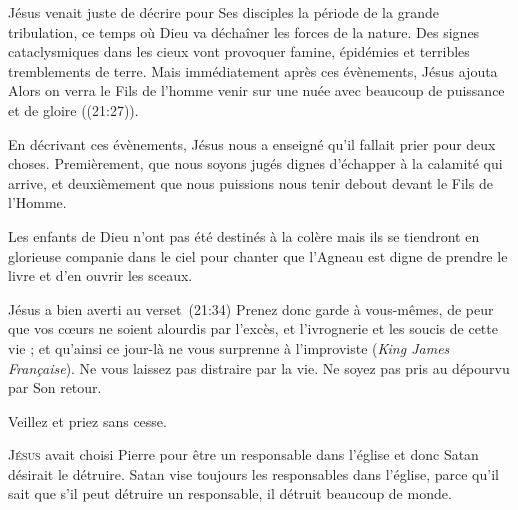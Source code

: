 Jésus venait juste de décrire pour Ses disciples la période
 de la grande tribulation, ce temps où Dieu va déchaîner les forces
 de la nature. Des signes cataclysmiques dans les cieux vont provoquer famine,
 épidémies et terribles tremblements de terre.
 Mais immédiatement après ces évènements, Jésus ajouta\frcolon{} 
 \Og Alors on verra le Fils de l'homme venir sur une nuée avec beaucoup
 de puissance et de gloire \Fg{} ((21:27)).


En décrivant ces évènements, Jésus nous a enseigné qu'il fallait prier pour deux choses.
 Premièrement, que nous soyons jugés dignes d'échapper à la calamité
 qui arrive, et deuxièmement que nous puissions nous tenir debout
 devant le Fils de l'Homme.

Les enfants de Dieu n'ont pas été destinés à la colère mais ils se tiendront
 en glorieuse companie dans le ciel pour chanter que l'Agneau
 est digne de prendre le livre et d'en ouvrir les sceaux.

Jésus a bien averti au verset~(21:34)\frcolon{} 
 \Og Prenez donc garde à vous-mêmes, de peur que vos c\oe{}urs ne soient
 alourdis par l’excès, et l’ivrognerie et les soucis de cette vie ;
 et qu'ainsi ce jour-là ne vous surprenne à l’improviste \Fg{}
 (\textit{King James Fran\c{c}aise}).
 Ne vous laissez pas distraire par la vie.
 Ne soyez pas pris au dépourvu par Son retour.

Veillez et priez \ocadr sans cesse.

\dvrule






\lettrine{J}{ésus} avait choisi Pierre pour être un responsable
 dans l'église 
 et donc Satan désirait le détruire.
 Satan vise toujours les responsables dans l'église, 
 parce qu'il sait que s'il peut détruire un responsable,
 il détruit beaucoup de monde.

